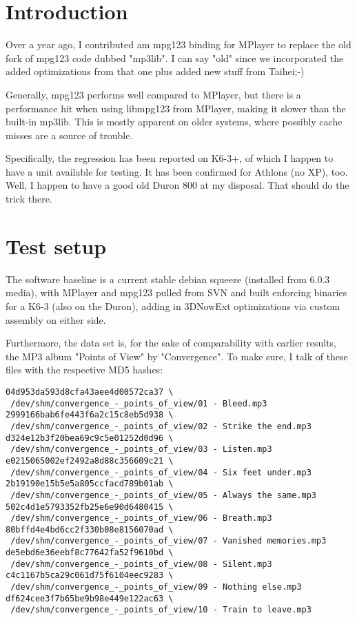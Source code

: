 \documentclass[a4paper,12pt]{scrartcl}
\begin{document}
\setlength{\parindent}{0pt}
\setlength{\parskip}{0.5em}


\tableofcontents

\section{Introduction}

Over a year ago, I contributed am mpg123 binding for MPlayer to replace the old fork of mpg123 code dubbed "mp3lib". I can say "old" since we incorporated the added optimizations from that one plus added new stuff from Taihei;-)

Generally, mpg123 performs well compared to MPlayer, but there is a performance hit when using libmpg123 from MPlayer, making it slower than the built-in mp3lib. This is mostly apparent on older systems, where possibly cache misses are a source of trouble.

Specifically, the regression has been reported on K6-3+, of which I happen to have a unit available for testing. It has been confirmed for Athlons (no XP), too. Well, I happen to have a good old Duron 800 at my disposal. That should do the trick there.

\section{Test setup}

The software baseline is a current stable debian squeeze (installed from 6.0.3 media), with MPlayer and mpg123 pulled from SVN and built enforcing binaries for a K6-3 (also on the Duron), adding in 3DNowExt optimizations via custom assembly on either side.

Furthermore, the data set is, for the sake of comparability with earlier results, the MP3 album "Points of View" by "Convergence". To make sure, I talk of these files with the respective MD5 hashes:

\begin{verbatim}
04d953da593d8cfa43aee4d00572ca37 \
 /dev/shm/convergence_-_points_of_view/01 - Bleed.mp3
2999166bab6fe443f6a2c15c8eb5d938 \
 /dev/shm/convergence_-_points_of_view/02 - Strike the end.mp3
d324e12b3f20bea69c9c5e01252d0d96 \
 /dev/shm/convergence_-_points_of_view/03 - Listen.mp3
e0215065002ef2492a8d88c356609c21 \
 /dev/shm/convergence_-_points_of_view/04 - Six feet under.mp3
2b19190e15b5e5a805ccfacd789b01ab \
 /dev/shm/convergence_-_points_of_view/05 - Always the same.mp3
502c4d1e5793352fb25e6e90d6480415 \
 /dev/shm/convergence_-_points_of_view/06 - Breath.mp3
80bffd4e4bd6cc2f330b08e8156070ad \
 /dev/shm/convergence_-_points_of_view/07 - Vanished memories.mp3
de5ebd6e36eebf8c77642fa52f9610bd \
 /dev/shm/convergence_-_points_of_view/08 - Silent.mp3
c4c1167b5ca29c061d75f6104eec9283 \
 /dev/shm/convergence_-_points_of_view/09 - Nothing else.mp3
df624cee3f7b65be9b98e449e122ac63 \
 /dev/shm/convergence_-_points_of_view/10 - Train to leave.mp3
\end{verbatim}
\end{document}

